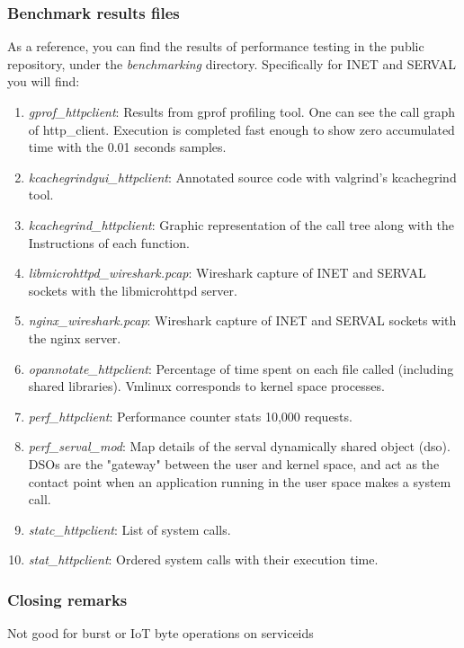 \subsubsection{Benchmark results files}
As a reference, you can find the results of performance testing in the public repository, under the \emph{benchmarking} directory.
Specifically for INET and SERVAL you will find:
\begin{enumerate}
  \item \emph{gprof\_httpclient}: Results from gprof profiling tool. One can see the call graph of http\_client. Execution is completed fast enough to show zero accumulated time with the 0.01 seconds samples.
  \item \emph{kcachegrindgui\_httpclient}: Annotated source code with valgrind's kcachegrind tool.
  \item \emph{kcachegrind\_httpclient}: Graphic representation of the call tree along with the Instructions of each function.
  \item \emph{libmicrohttpd\_wireshark.pcap}: Wireshark capture of INET and SERVAL sockets with the libmicrohttpd server.
  \item \emph{nginx\_wireshark.pcap}: Wireshark capture of INET and SERVAL sockets with the nginx server.
  \item \emph{opannotate\_httpclient}: Percentage of time spent on each file called (including shared libraries). Vmlinux corresponds to kernel space processes.
  \item \emph{perf\_httpclient}: Performance counter stats 10,000 requests.
  \item \emph{perf\_serval\_mod}: Map details of the serval dynamically shared object (dso). DSOs are the "gateway" between the user and kernel space, and act as the contact point when an application running in the user space makes a system call.
  \item \emph{statc\_httpclient}: List of system calls.
  \item \emph{stat\_httpclient}: Ordered system calls with their execution time.
\end{enumerate}

\newpage
\subsubsection{Closing remarks}

Not good for burst 
or IoT
byte operations on serviceids
